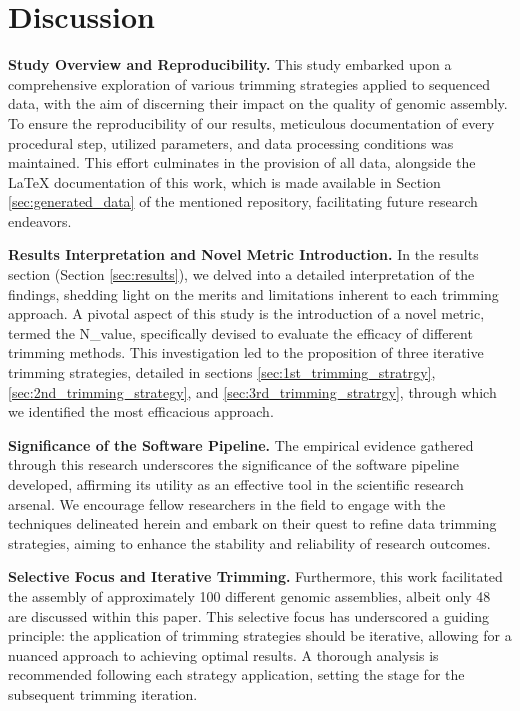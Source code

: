 \chapter{Discussion}

\textbf{Study Overview and Reproducibility.} This study embarked upon a comprehensive exploration of various trimming strategies applied to sequenced data, with the aim of discerning their impact on the quality of genomic assembly. To ensure the reproducibility of our results, meticulous documentation of every procedural step, utilized parameters, and data processing conditions was maintained. This effort culminates in the provision of all data, alongside the LaTeX documentation of this work, which is made available in Section \ref{sec:generated_data} of the mentioned repository, facilitating future research endeavors.

\textbf{Results Interpretation and Novel Metric Introduction.} In the results section (Section \ref{sec:results}), we delved into a detailed interpretation of the findings, shedding light on the merits and limitations inherent to each trimming approach. A pivotal aspect of this study is the introduction of a novel metric, termed the N\_value, specifically devised to evaluate the efficacy of different trimming methods. This investigation led to the proposition of three iterative trimming strategies, detailed in sections \ref{sec:1st_trimming_stratrgy}, \ref{sec:2nd_trimming_strategy}, and \ref{sec:3rd_trimming_stratrgy}, through which we identified the most efficacious approach.

\textbf{Significance of the Software Pipeline.} The empirical evidence gathered through this research underscores the significance of the software pipeline developed, affirming its utility as an effective tool in the scientific research arsenal. We encourage fellow researchers in the field to engage with the techniques delineated herein and embark on their quest to refine data trimming strategies, aiming to enhance the stability and reliability of research outcomes.

\textbf{Selective Focus and Iterative Trimming.} Furthermore, this work facilitated the assembly of approximately 100 different genomic assemblies, albeit only 48 are discussed within this paper. This selective focus has underscored a guiding principle: the application of trimming strategies should be iterative, allowing for a nuanced approach to achieving optimal results. A thorough analysis is recommended following each strategy application, setting the stage for the subsequent trimming iteration.

